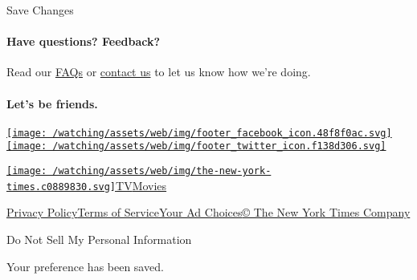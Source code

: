 Save Changes

\hypertarget{have-questions-feedback}{%
\paragraph{Have questions? Feedback?}\label{have-questions-feedback}}

Read our \href{//www.nytimes.com/2017/01/10/watching/faq.html}{FAQs} or
\href{mailto:watchingcare@nytimes.com}{contact us} to let us know how
we're doing.

\hypertarget{lets-be-friends}{%
\paragraph{Let's be friends.}\label{lets-be-friends}}

\href{https://www.facebook.com/nytwatching/}{\texttt{[image: /watching/assets/web/img/footer\_facebook\_icon.48f8f0ac.svg]}}\href{https://twitter.com/watching}{\texttt{[image: /watching/assets/web/img/footer\_twitter\_icon.f138d306.svg]}}

\href{//www.nytimes.com}{\texttt{[image: /watching/assets/web/img/the-new-york-times.c0889830.svg]}}\href{//www.nytimes.com/section/arts/television}{TV}\href{//www.nytimes.com/section/movies}{Movies}

\href{//www.nytimes.com/content/help/rights/privacy/policy/privacy-policy.html}{Privacy
Policy}\href{//www.nytimes.com/content/help/rights/terms/terms-of-service.html}{Terms
of
Service}\href{//www.nytimes.com/content/help/rights/privacy/policy/privacy-policy.html\#pp}{Your
Ad Choices}\href{http://www.nytco.com/}{© The New York Times Company}

Do Not Sell My Personal Information

Your preference has been saved.
